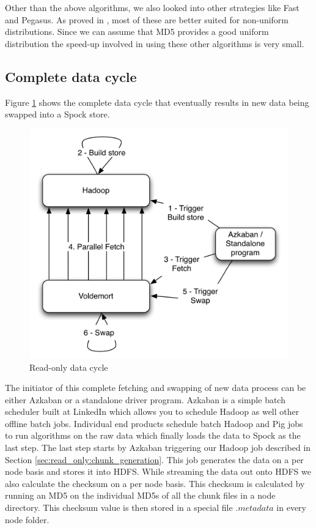 \documentclass[twocolumn]{article}
\newcommand{\projectname}{Spock}
\begin{document}
Other than the above algorithms, we also looked into other strategies like Fast and Pegasus. As proved in \cite{manolopoulos}, most of these are better suited for non-uniform distributions. Since we can assume that MD5 provides a good uniform distribution the speed-up involved in using these other algorithms is very small. 


\subsection{Complete data cycle}
\label{sec:read_only:data_cycle}

Figure \ref{cycle} shows the complete data cycle that eventually results in new data being swapped into a \projectname{} store. 

\begin{figure}
  \centering
    \includegraphics[scale=0.60]{images/cycle.png}
  \caption{Read-only data cycle}
  \label{cycle}
\end{figure}

The initiator of this complete fetching and swapping of new data process can be either Azkaban or a standalone driver program. Azkaban\cite{azkaban} is a simple batch scheduler built at LinkedIn which allows you to schedule Hadoop as well other offline batch jobs. Individual end products schedule batch Hadoop and Pig jobs to run algorithms on the raw data which finally loads the data to \projectname{} as the last step. The last step starts by Azkaban triggering our Hadoop job described in Section \ref{sec:read_only:chunk_generation}. This job generates the data on a per node basis and stores it into HDFS. While streaming the data out onto HDFS we also calculate the checksum on a per node basis. This checksum is calculated by running an MD5 on the individual MD5s of all the chunk files in a node directory. This checksum value is then stored in a special file $.metadata$ in every node folder. 
\end{document}
